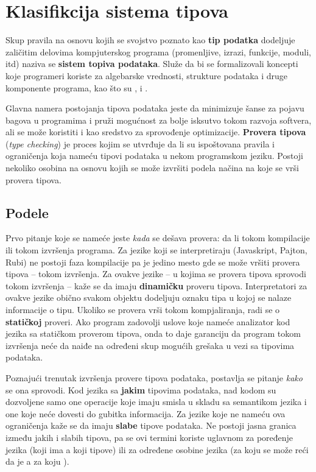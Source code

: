 \section{Klasifikcija sistema tipova}

Skup pravila na osnovu kojih se svojstvo poznato kao \textbf{tip podatka} dodeljuje zaličitim delovima kompjuterskog programa (promenljive, izrazi, funkcije, moduli, itd) naziva se \textbf{sistem topiva podataka}.
Služe da bi se formalizovali koncepti koje programeri koriste za algebarske vrednosti, strukture podataka i druge komponente programa, kao što su ,  i .

Glavna namera postojanja tipova podataka jeste da minimizuje šanse za pojavu bagova u programima i pruži mogućnost za bolje isksutvo tokom razvoja softvera, ali se može koristiti i kao sredstvo za sprovođenje optimizacije.
\textbf{Provera tipova} (\textsl{type checking}) je proces kojim se utvrđuje da li su ispoštovana pravila i ograničenja koja nameću tipovi podataka u nekom programskom jeziku.
Postoji nekoliko osobina na osnovu kojih se može izvršiti podela načina na koje se vrši provera tipova.

\subsection{Podele}

Prvo pitanje koje se nameće jeste \textit{kada} se dešava provera: da li tokom kompilacije ili tokom izvršenja programa.
Za jezike koji se interpretiraju (Javaskript, Pajton, Rubi) ne postoji faza kompilacije pa je jedino mesto gde se može vršiti provera tipova -- tokom izvršenja.
Za ovakve jezike -- u kojima se provera tipova sprovodi tokom izvršenja -- kaže se da imaju \textbf{dinamičku} proveru tipova.
Interpretatori za ovakve jezike obično svakom objektu dodeljuju oznaku tipa u kojoj se nalaze informacije o tipu.
Ukoliko se provera vrši tokom kompjaliranja, radi se o \textbf{statičkoj} proveri.
Ako program zadovolji uslove koje nameće analizator kod jezika sa statičkom proverom tipova, onda to daje garanciju da program tokom izvršenja neće da naiđe na određeni skup mogućih grešaka u vezi sa tipovima podataka.

Poznajući trenutak izvršenja provere tipova podataka, postavlja se pitanje \textit{kako} se ona sprovodi.
Kod jezika sa \textbf{jakim} tipovima podataka, nad kodom su dozvoljene samo one operacije koje imaju smisla u skladu sa semantikom jezika i one koje neće dovesti do gubitka informacija.
Za jezike koje ne nameću ova ograničenja kaže se da imaju \textbf{slabe} tipove podataka.
Ne postoji jasna granica između jakih i slabih tipova, pa se ovi termini koriste uglavnom za poređenje jezika (koji ima  a koji  tipove) ili za određene osobine jezika (za koju se može reći da je  a za koju ).

